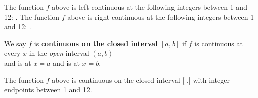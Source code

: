 \documentclass[10pt, answers]{exam}
\begin{document}
\begin{questions}
\question The function $f$ above is left continuous at the following integers between 1 and 12: \fillin[1, 7].
\question The function $f$ above is right continuous at the following integers between 1 and 12: \fillin[1, 6].

\question We say $f$ is \textbf{continuous on the closed interval \boldmath $[a,b]$}
  if $f$ is continuous at every $x$ in the \emph{open} interval $(a,b)$
  \\[1ex]
  and is  at $x=a$
  and is  at $x=b$.

\question The function $f$ above is continuous on the closed interval [ \fillin[6][5mm],\fillin[7][5mm] ] with integer endpoints between 1 and 12.
%
\end{questions}
\end{document}
